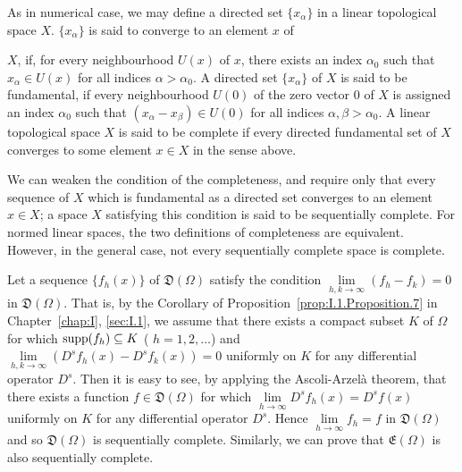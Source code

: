 \label{sec:IV.3}

\begin{definitionu} As in numerical case, we may define a directed set $\{x_{\alpha}\}$ in a linear topological space $X$. $\{x_{\alpha}\}$ is said to converge to an element $x$ of 
\end{definitionu}

$X$, if, for every neighbourhood $U(x)$ of $x$, there exists an index $\alpha_{0}$ such that $x_{\alpha} \in U(x)$ for all indices $\alpha > \alpha_{0}$. A directed set $\{x_{\alpha}\}$ of $X$ is said to be fundamental, if every neighbourhood $U(0)$ of the zero vector $0$ of $X$ is assigned an index $\alpha_{0}$ such that $(x_{\alpha} - x_{\beta}) \in U(0)$ for all indices $\alpha, \beta > \alpha_{0}$. A linear topological space $X$ is said to be complete if every directed fundamental set of $X$ converges to some element $x \in X$ in the sense above. 

\begin{remarku} We can weaken the condition of the completeness, and require only that every sequence of $X$ which is fundamental as a directed set converges to an element $x \in X$; a space $X$ satisfying this condition is said to be sequentially complete. For normed linear spaces, the two definitions of completeness are equivalent. However, in the general case, not every sequentially complete space is complete. 
\end{remarku}

\begin{examplen} Let a sequence $\{f_h(x)\}$ of $\mathfrak{D}(\Omega)$ satisfy the condition $\lim\limits_{h,k\to \infty}(f_h - f_k) = 0$ in $\mathfrak{D}(\Omega)$. That is, by the Corollary of Proposition~\ref{prop:I.1.Proposition.7} in Chapter~\ref{chap:I}, \ref{sec:I.1}, we assume that there exists a compact subset $K$ of $\Omega$ for which $\operatorname{supp}(f_h)\subseteq K$ ( $h = 1,2,\ldots$) and $\lim\limits_{h,k\to \infty}(D^s f_h(x) - D^s f_k(x)) = 0$ uniformly on $K$ for any differential operator $D^{s}$. Then it is easy to see, by applying the Ascoli-Arzelà theorem, that there exists a function $f\in \mathfrak{D}(\Omega)$ for which $\lim\limits_{h\to \infty}D^{s}f_{h}(x) = D^{s}f(x)$ uniformly on $K$ for any differential operator $D^{s}$. Hence $\lim\limits_{h\to \infty}f_{h} = f$ in $\mathfrak{D}(\Omega)$ and so $\mathfrak{D}(\Omega)$ is sequentially complete. Similarly, we can prove that $\mathfrak{E}(\Omega)$ is also sequentially complete. 
\end{examplen}

